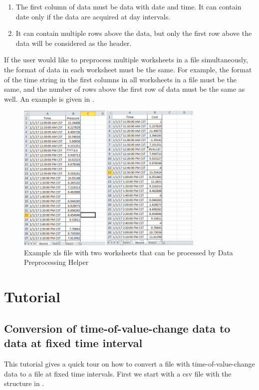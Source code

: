\documentclass[12pt,a4paper]{article}
\begin{document}
\begin{enumerate}
\item The first column of data must be data with date and time. It can contain date only if the data are acquired at day intervals.
\item It can contain multiple rows above the data, but only the first row above the data will be considered as the header.
\end{enumerate}

If the user would like to preprocess multiple worksheets in a file simultaneously, the format of data in each worksheet must be the same.
For example, the format of the time string in the first columns in all worksheets in a file must be the same, and the number of rows above the first row of data must be the same as well.
An example is given in .

\begin{figure}[H]
\centering
\includegraphics[width=0.8\textwidth]{xls-file.png}
\caption{Example xls file with two worksheets that can be processed by Data Preprocessing Helper}
\label{fig:xls_file}
\end{figure}

\section{Tutorial}

\subsection{Conversion of time-of-value-change data to data at fixed time interval}

This tutorial gives a quick tour on how to convert a file with time-of-value-change data to a file at fixed time intervals.
First we start with a csv file with the structure in .
\end{document}
